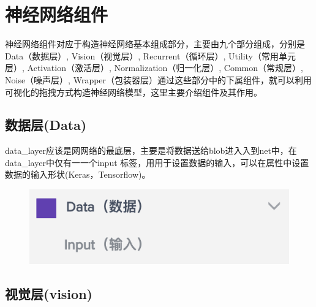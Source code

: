 \documentclass{progbookcn}
\begin{document}
\chapter{神经网络组件}

神经网络组件对应于构造神经网络基本组成部分，主要由九个部分组成，分别是Data（数据层）, Vision（视觉层）, Recurrent（循环层）, Utility（常用单元层）, Activation（激活层）, Normalization（归一化层）, Common（常规层）, Noise（噪声层）,  Wrapper（包装器层）通过这些部分中的下属组件，就可以利用可视化的拖拽方式构造神经网络模型，这里主要介绍组件及其作用。

\section{数据层(Data)}

data\_layer应该是⽹网络的最底层，主要是将数据送给blob进⼊入到net中，在data\_layer中仅有⼀一个input 标签，⽤用于设置数据的输入，可以在属性中设置数据的输入形状(Keras，Tensorflow)。

\begin{figure}[H]
  \centering
  \includegraphics[scale = 0.6]{Data_layer.png}
\end{figure}




\section{视觉层(vision)}
\end{document}
